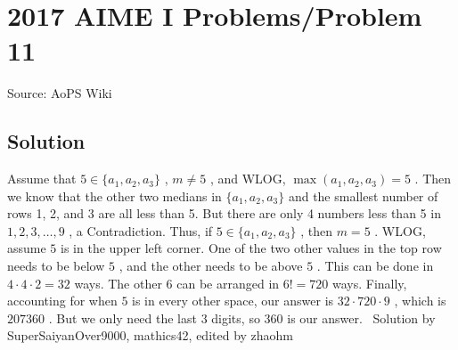 \documentclass[12pt]{article}
\begin{document}
\section*{{2017 AIME I Problems/Problem 11}}
Source: AoPS Wiki

\subsection*{Solution}
Assume that $5 \in \{a_1, a_2, a_3\}$ , $m \neq 5$ , and WLOG, $\max{(a_1, a_2, a_3)} = 5$ . Then we know that the other two medians in $\{a_1, a_2, a_3\}$ and the smallest number of rows 1, 2, and 3 are all less than 5. But there are only 4 numbers less than 5 in $1, 2, 3, \dots, 9$ , a Contradiction. Thus, if $5 \in \{a_1, a_2, a_3\}$ , then $m = 5$ . WLOG, assume $5$ is in the upper left corner. One of the two other values in the top row needs to be below $5$ , and the other needs to be above $5$ . This can be done in $4\cdot4\cdot2=32$ ways.
The other $6$ can be arranged in $6!=720$ ways.
Finally, accounting for when $5$ is in every other space, our answer is $32\cdot720\cdot9$ , which is $207360$ . But we only need the last $3$ digits, so $\boxed{360}$ is our answer. ~Solution by SuperSaiyanOver9000, mathics42, edited by zhaohm
\end{document}
